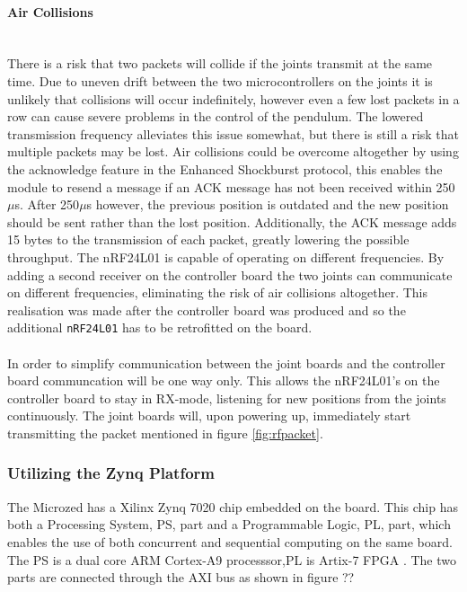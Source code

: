\paragraph{Air Collisions}~\\ %
\label{par:air_collisions}
There is a risk that two packets will collide if the joints transmit at the same time.
Due to uneven drift between the two microcontrollers on the joints it is unlikely that collisions will occur indefinitely, however even a few lost packets in a row can cause severe problems in the control of the pendulum.
The lowered transmission frequency alleviates this issue somewhat, but there is still a risk that multiple packets may be lost.
Air collisions could be overcome altogether by using the acknowledge feature in the Enhanced Shockburst protocol, this enables the module to resend a message if an ACK message has not been received within 250$\mu$s.
After 250$\mu$s however, the previous position is outdated and the new position should be sent rather than the lost position.
Additionally, the ACK message adds 15 bytes to the transmission of each packet, greatly lowering the possible throughput.
The nRF24L01 is capable of operating on different frequencies.
By adding a second receiver on the controller board the two joints can communicate on different frequencies, eliminating the risk of air collisions altogether.
This realisation was made after the controller board was produced and so the additional \texttt{nRF24L01} has to be retrofitted on the board. 
\\~\\
In order to simplify communication between the joint boards and the controller board communcation will be one way only.
This allows the nRF24L01's on the controller board to stay in RX-mode, listening for new positions from the joints continuously.
The joint boards will, upon powering up, immediately start transmitting the packet mentioned in figure \ref{fig:rfpacket}.

\subsubsection{Utilizing the Zynq Platform} %
\label{ssub:utializing_the_zynq_platform}
The Microzed has a Xilinx Zynq 7020 chip embedded on the board. 
This chip has both a Processing System, PS, part and a Programmable Logic, PL, part, which enables the use of both concurrent and sequential computing on the same board. 
The PS is a dual core ARM Cortex-A9 processsor,PL is Artix-7 FPGA \cite{zynq_data_sheet}.
The two parts are connected through the AXI bus as shown in figure ??

